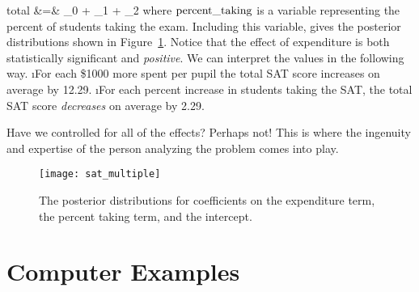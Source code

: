 \beqn
{\rm total} &=& \beta_{0} + \beta_{1} + \beta_{2}
\eeqn
where $\rm percent\_taking$ is a variable representing the percent of students taking the exam.  Including this variable, gives the posterior distributions shown in Figure~\ref{fig:sat_multiple}.  Notice that the effect of expenditure is both statistically significant and \emph{positive}.  We can interpret the values in the following way.
\bi
\i For each \$1000 more spent per pupil the total SAT score increases on average by 12.29.
\i For each percent increase in students taking the SAT, the total SAT score \emph{decreases} on average by 2.29.
\ei

Have we controlled for all of the effects?  Perhaps not!  This is where the ingenuity and expertise of the person analyzing the problem comes into play.


\begin{figure}
\texttt{[image: sat\_multiple]}
\caption{The posterior distributions for coefficients on the expenditure term, the percent taking term, and the intercept.}\label{fig:sat_multiple}
\end{figure}



\section{Computer Examples}
\begin{fullwidth}

\end{fullwidth}